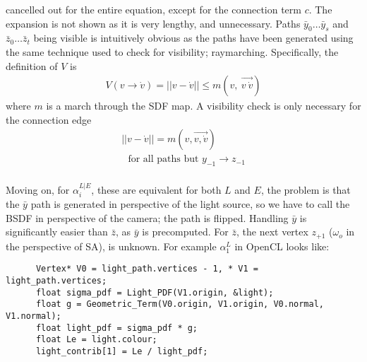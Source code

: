 \documentclass{article}
\begin{document}
    cancelled out for the entire equation, except for the connection term $c$.
    The expansion is not shown as it is very lengthy, and unnecessary. Paths
    $\bar{y}_{0} \ldots \bar{y}_s$ and $\bar{z}_0 \ldots \bar{z}_t$ being
    visible is intuitively obvious as the paths have been generated using the
    same technique used to check for visibility; raymarching. Specifically, the
    definition of $V$ is
  \begin{align}
    V(v \rightarrow \dot{v}) = ||v - \dot{v}|| \leq
    m(v,\:\overrightarrow{v\:\dot{v}})
  \end{align}
    where $m$ is a march through the SDF map. A visibility check is only
    necessary for the connection edge
    \begin{align*}
      ||v - \dot{v}|| = m(v, \overrightarrow{v, \dot{v}})\\
      \:\:\:\text{for all paths but } y_{-1} \rightarrow z_{-1} 
    \end{align*}
\\
    Moving on, for $\alpha^{L|E}_i$, these are equivalent for both $L$ and $E$,
    the problem is that the $\bar{y}$ path is generated in perspective of the
    light source, so we have to call the BSDF in perspective of the camera; the
    path is flipped. Handling $\bar{y}$ is significantly easier than $\bar{z}$,
    as $\bar{y}$ is precomputed. For $\bar{z}$, the next vertex $z_{+1}$
    ($\omega_o$ in the perspective of SA), is unknown. For example $\alpha^L_1$
    in OpenCL looks like:

    \begin{lstlisting}
      Vertex* V0 = light_path.vertices - 1, * V1 = light_path.vertices;
      float sigma_pdf = Light_PDF(V1.origin, &light);
      float g = Geometric_Term(V0.origin, V1.origin, V0.normal, V1.normal);
      float light_pdf = sigma_pdf * g;
      float Le = light.colour;
      light_contrib[1] = Le / light_pdf;
    \end{lstlisting}
\end{document}
